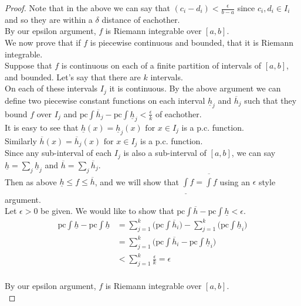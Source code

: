 \documentclass[12pt]{article}
\begin{document}
\begin{proof}
		Note that in the above we can say that $(c_i - d_i) < \frac{\epsilon}{b-a}$ since $c_i,d_i \in I_i$ and so they are within a $\delta$ distance of eachother.\\
		
		By our epsilon argument, $f$ is Riemann integrable over $[a,b]$. \\
		
		We now prove that if $f$ is piecewise continuous and bounded, that it is Riemann integrable. \\
		
		Suppose that $f$ is continuous on each of a finite partition of intervals of $[a,b]$, and bounded. Let's say that there are $k$ intervals.\\
		On each of these intervals $I_j$ it is continuous. By the above argument we can define two piecewise constant functions on each interval $\underline{h}_j$ and $\overline{h}_j$ such that they bound $f$ over $I_j$ and $\text{pc}\int\overline{h}_j - \text{pc}\int \underline {h}_j < \frac{\epsilon}{k}$ of eachother. \\
		It is easy to see that $\underline{h}(x) = \underline{h}_j(x) \text{ for } x \in I_j$ is a p.c. function. \\
		Similarly $\overline{h}(x) = \overline{h}_j(x) \text{ for } x \in I_j$ is a p.c. function. \\
		Since any sub-interval of each $I_j$ is also a sub-interval of $[a,b]$, we can say $\underline{h} = \sum\limits_{j}\underline{h}_j$ and $\overline{h} = \sum\limits_{j}\overline{h}_j$. \\
		
		Then as above $\underline{h} \leq f \leq \overline{h}$, and we will show that $\underline{\int}f = \overline{\int}f$ using an $\epsilon$ style argument. \\
		
		Let $\epsilon > 0$ be given. We would like to show that $\text{pc}\int\overline{h} - \text{pc}\int \underline{h} < \epsilon$.\\
		\begin{align*}
			\text{pc}\int\underline{h} - \text{pc}\int\underline{h} & = \sum\limits_{j=1}^k \Big( \text{pc}\int\overline{h}_i \Big) - \sum\limits_{j=1}^k \Big( \text{pc}\int\underline{h}_i \Big) \\
			& = \sum\limits_{j=1}^k \Big( \text{pc}\int\overline{h}_i - \text{pc}\int\underline{h}_i \Big) \\
			& < \sum\limits_{j=1}^k \frac{\epsilon}{k} = \epsilon\\
		\end{align*}
		
		By our epsilon argument, $f$ is Riemann integrable over $[a,b]$. \\		
	\end{proof}
\end{document}

